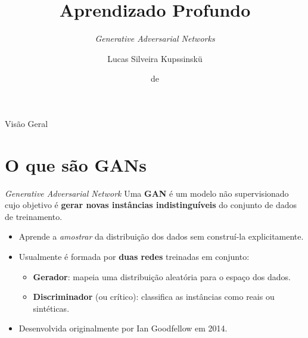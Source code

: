 \documentclass[aspectratio=169,xcolor=dvipsnames]{beamer}
\title{Aprendizado Profundo}
\subtitle{\textit{Generative Adversarial Networks}}
\author{Lucas Silveira Kupssinskü}
\institute
{
    Machine Learning Theory and Applications Laboratory \\
    PUCRS
}
\date{\mespor de \the\year}
\begin{document}
  \begin{frame}
    \titlepage
  \end{frame}

  \begin{frame}{Visão Geral}
    \tableofcontents
  \end{frame}

  \section{O que são GANs}

  \begin{frame}{\textit{Generative Adversarial Network}}
    Uma \textbf{GAN} é um modelo não supervisionado cujo objetivo é
    \textbf{gerar novas instâncias indistinguíveis} do conjunto de dados
    de treinamento.
    \vspace{0.5em}
    \begin{itemize}
      \item Aprende a \emph{amostrar} da distribuição dos dados sem
      construí-la explicitamente.
      \item Usualmente é formada por \textbf{duas redes} treinadas em
      conjunto:
      \begin{itemize}
        \item \textcolor{GenRed}{\textbf{Gerador}}: mapeia uma distribuição
        aleatória para o espaço dos dados.
        \item \textcolor{DiscBlue}{\textbf{Discriminador}} (ou crítico):
        classifica as instâncias como reais ou sintéticas.
      \end{itemize}
      \item Desenvolvida originalmente por Ian Goodfellow em 2014.
    \end{itemize}
  \end{frame}
\end{document}
